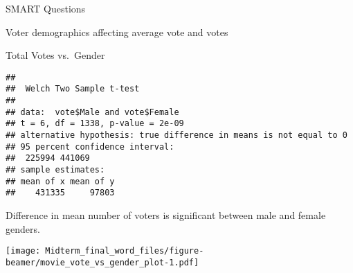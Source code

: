\documentclass[
  ignorenonframetext,
]{beamer}
\newenvironment{Shaded}{\begin{snugshade}}{\end{snugshade}}
\newcommand{\AttributeTok}[1]{\textcolor[rgb]{0.77,0.63,0.00}{#1}}
\newcommand{\CommentTok}[1]{\textcolor[rgb]{0.56,0.35,0.01}{\textit{#1}}}
\newcommand{\DecValTok}[1]{\textcolor[rgb]{0.00,0.00,0.81}{#1}}
\newcommand{\FunctionTok}[1]{\textcolor[rgb]{0.00,0.00,0.00}{#1}}
\newcommand{\NormalTok}[1]{#1}
\newcommand{\OtherTok}[1]{\textcolor[rgb]{0.56,0.35,0.01}{#1}}
\newcommand{\SpecialCharTok}[1]{\textcolor[rgb]{0.00,0.00,0.00}{#1}}
\newcommand{\StringTok}[1]{\textcolor[rgb]{0.31,0.60,0.02}{#1}}
\begin{document}
\begin{frame}[fragile]{SMART Questions}
\begin{block}{Voter demographics affecting average vote and votes}
\begin{block}{Total Votes vs.~Gender}
\begin{Shaded}
\end{Shaded}

\begin{verbatim}
## 
##  Welch Two Sample t-test
## 
## data:  vote$Male and vote$Female
## t = 6, df = 1338, p-value = 2e-09
## alternative hypothesis: true difference in means is not equal to 0
## 95 percent confidence interval:
##  225994 441069
## sample estimates:
## mean of x mean of y 
##    431335     97803
\end{verbatim}

Difference in mean number of voters is significant between male and
female genders.

\begin{Shaded}
\end{Shaded}

\texttt{[image: Midterm\_final\_word\_files/figure-beamer/movie\_vote\_vs\_gender\_plot-1.pdf]}

\begin{Shaded}
\end{Shaded}


\end{block}
\end{block}
\end{frame}
\end{document}
